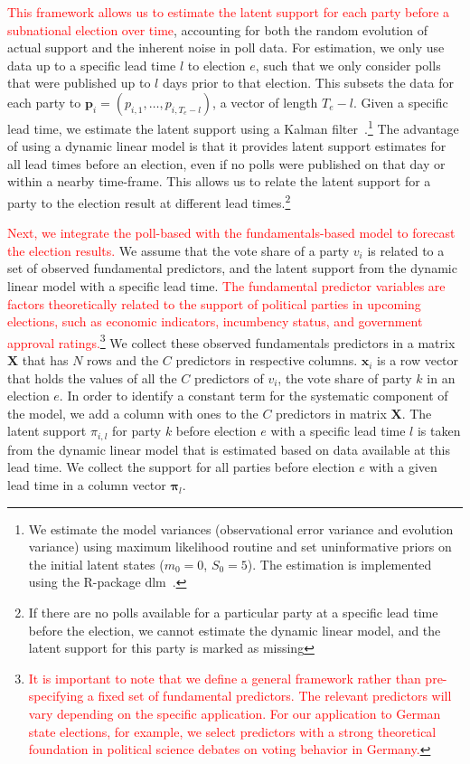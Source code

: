 \documentclass[12pt]{article}
\begin{document}
\begin{doublespacing}
\textcolor{red}{This framework allows us to estimate the latent support for each party before a subnational election over time}, accounting for both the random evolution of actual support and the inherent noise in poll data. For estimation, we only use data up to a specific lead time $l$ to  election $e$,  such that we only consider polls that were published up to $l$ days prior to that election. This subsets the data for each party to \( \boldsymbol{p}_{i} = (p_{i,1},  \ldots, p_{i,T_{e}-l})\), a vector of length $T_{e}-l$. Given a specific lead time, we estimate the latent support using a Kalman filter~\citep[][p.103-107]{west1997}.\footnote{We estimate the model variances (observational error variance and evolution variance) using maximum likelihood routine and set uninformative priors on the initial latent states ($m_0 = 0$, $S_0 = 5$). The estimation is implemented using the R-package dlm~\citep{petris2010dlm}.} The advantage of using a dynamic linear model is that it provides latent support estimates for all lead times before an election, even if no polls were published on that day or within a nearby time-frame. This allows us to relate the latent support for a party to the election result at different lead times.\footnote{If there are no polls available for a particular party at a specific lead time before the election, we cannot estimate the dynamic linear model, and the latent support for this party is marked as missing} 

\textcolor{red}{Next, we integrate the poll-based with the fundamentals-based model to forecast the election results.} We assume that the vote share of a party $v_i$ is related to a set of observed fundamental predictors, and the latent support from the dynamic linear model with a specific lead time. \textcolor{red}{The fundamental predictor variables are factors theoretically related to the support of political parties in upcoming elections, such as economic indicators, incumbency status, and government approval ratings.}\footnote{\textcolor{red}{It is important to note that we define a general framework rather than pre-specifying a fixed set of fundamental predictors. The relevant predictors will vary depending on the specific application. For our application to German state elections, for example, we select predictors with a strong theoretical foundation in political science debates on voting behavior in Germany.}} We collect these observed fundamentals predictors in a matrix $\bm{X}$ that has $N$ rows and the $C$ predictors in respective columns.  
$\bm{x}_i$ is a row vector that holds the values of all the $C$ predictors of $v_i$, the vote share of party $k$ in an election $e$. In order to identify a constant term for the systematic component of the model, we add a column with ones to the $C$ predictors in matrix $\bm{X}$. The latent support ${\pi}_{i,l}$ for party $k$ before election $e$ with a specific lead time $l$ is taken from the dynamic linear model that is estimated based on data available at this lead time. We collect the support for all parties before election $e$ with a given lead time in a column vector $\bm{\pi}_{l}$. %


\end{doublespacing}
\end{document}
